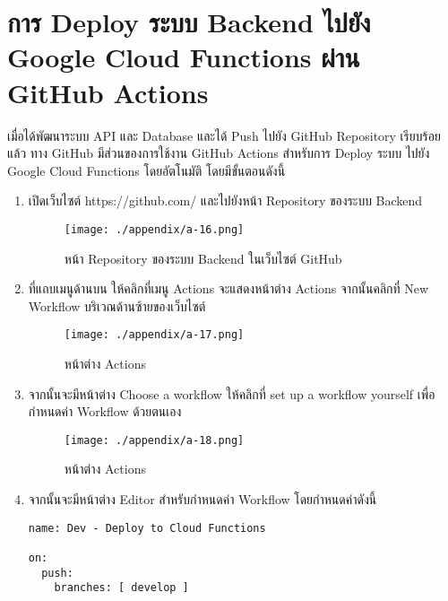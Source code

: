 \section{การ Deploy ระบบ Backend ไปยัง Google Cloud Functions ผ่าน GitHub Actions}
เมื่อได้พัฒนาระบบ API และ Database และได้ Push ไปยัง GitHub Repository เรียบร้อยแล้ว ทาง GitHub มีส่วนของการใช้งาน GitHub Actions สำหรับการ Deploy ระบบ ไปยัง Google Cloud Functions โดยอัตโนมัติ โดยมีขั้นตอนดังนี้
\begin{enumerate}
    \item เปิดเว็บไซต์ https://github.com/ และไปยังหน้า Repository ของระบบ Backend
    \begin{figure}
        \texttt{[image: ./appendix/a-16.png]}
        \caption{หน้า Repository ของระบบ Backend ในเว็บไซต์ GitHub}
    \end{figure}
    \item ที่แถบเมนูด้านบน ให้คลิกที่เมนู Actions จะแสดงหน้าต่าง Actions จากนั้นคลิกที่ New Workflow บริเวณด้านซ้ายของเว็บไซต์
    \begin{figure}
        \texttt{[image: ./appendix/a-17.png]}
        \caption{หน้าต่าง Actions}
    \end{figure}
    \item จากนั้นจะมีหน้าต่าง Choose a workflow ให้คลิกที่ set up a workflow yourself เพื่อกำหนดค่า Workflow ด้วยตนเอง
    \begin{figure}
        \texttt{[image: ./appendix/a-18.png]}
        \caption{หน้าต่าง Actions}
    \end{figure}
    \item จากนั้นจะมีหน้าต่าง Editor สำหรับกำหนดค่า Workflow โดยกำหนดค่าดังนี้
    \begin{lstlisting}[caption=คำสั่ง Workflow]
name: Dev - Deploy to Cloud Functions

on:
  push:
    branches: [ develop ]


\end{lstlisting}
\end{enumerate}
